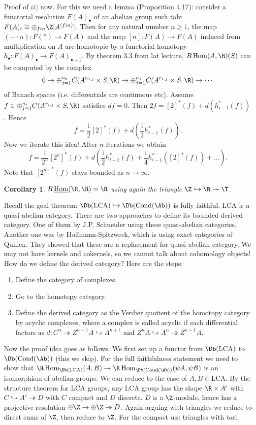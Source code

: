 \documentclass[A4paper, british]{amsart}
\theoremstyle{darkgreentheorem}
\newtheorem{cor}[thm]{Corollary}
\theoremstyle{darkbluedefinition}
\theoremstyle{darkredexample}
\theoremstyle{remark}
\DeclareMathOperator{\Hom}{Hom}
\DeclareMathOperator{\Cond}{Cond}
\DeclareMathOperator{\ihom}{\underline{Hom}}
\newcommand{\1}{\mathbbm{1}}
\newcommand{\op}{\oplus}
\newcommand{\tms}{\times}
\newcommand{\epi}{\twoheadrightarrow}
\newcommand{\mono}{\hookrightarrow}
\newcommand{\LCA}{\mathrm{LCA}}
\begin{document}
Proof of $ii)$ now.
For this we need a lemma (Proposition 4.17): consider a functorial resolution $F(A)_{\bullet}$ of an abelian group such taht $F(A)_{i}\cong \op_{fin}\Z[A^{(fin)}]$.
Then for any natural number $n\geqslant 1$, the map $(-\cdot n)\colon F(*)\to F(A)$ and the map $[n]\colon F(A)\to F(A)$ induced from multiplication on $A$ are homotopic by a functorial homotopy $h_{\bullet}\colon F(A)_{\bullet}\to F(A)_{\bullet +1}$.
By theorem 3.3 from lat lecture, $R\Hom(A,\R)(S)$ can be computed by the complex
\[ 0\to \op_{j=1}^{n_{0}}C(A^{r_{0,j}}\tms S,\R)\to \op_{j=1}^{n_{1}}C(A^{r_{1,j}}\tms S,\R)\to \cdots \]
of Banach spaces (i.e. differentials are continuous etc).
Assume $f\in \op_{j=1}^{n_{i}}C(A^{r_{i,j}}\tms S,\R)$ satisfies $df=0$.
Then $2f=[2]^{*}(f)+d(h_{i-1}^{*}(f))$.
Hence
\[ f=\frac{1}{2}[2]^{*}(f)+d(\frac{1}{2}h_{i-1}^{*}(f)).\]
Now we iterate this idea!
After $n$ iterations we obtain
\[ f=\frac{1}{2^{n}}[2^{n}]^{*}(f)+d(\frac{1}{2}h_{i-1}^{*}(f)+\frac{1}{4}h_{i-1}^{*}([2]^{*}(f))+\ldots ). \]
Note that $[2^{n}]^{*}(f)$ stays bounded as $n\to \infty$.

\begin{cor}
    $R\ihom(\R,\R)=\R$ using again the triangle $\Z\mono\R\epi\T$.
\end{cor}

Recall the goal theorem: $\Db(\LCA)\mono \Db(\Cond(\Ab))$ is fully faithful.
$\LCA$ is a quasi-abelian category.
There are two approaches to define its bounded derived category.
One of them by J.P. Schneider using these quasi-abelian categories.
Another one was by Hoffmann-Spitzweck, which is using exact categories of Quillen.
They showed that these are a replacement for quasi-abelian category.
We may not have kernels and cokernels, so we cannot talk about cohomology objects!
How do we define the derived category?
Here are the steps:

\begin{enumerate}
    \item Define the category of complexes.
    \item Go to the homotopy category.
    \item Define the derived category as the Verdier quotient of the homotopy category by acyclic complexes, where a complex is called acyclic if each differential factors as $d\colon C^{n}\epi Z^{n+1}A\mono A^{n+1}$ and $Z^{n}A\mono A^{n}\epi Z^{n+1}A$.
\end{enumerate}

Now the proof idea goes as follows.
We first set up a functor from $\Db(\LCA)$ to $\Db(\Cond(\Ab))$ (this we skip).
For the full faithfulness statement we need to show that $\R\Hom_{\Db(\LCA)}(A,B)\to \R\Hom_{\Db(\Cond(\Ab))}(\psi A,\psi B)$ is an isomorphism of abelian groups.
We can reduce to the case of $A,B\in \LCA$.
By the structure theorem for $\LCA$ groups, any $\LCA$ group has the shape $\R\tms A'$ with $C\mono A'\epi D$ with $C$ compact and $D$ discrete.
$D$ is a $\Z$-module, hence has a projective resolution $\op \Z\to \op \Z\epi D$.
Again arguing with triangles we reduce to direct sums of $\Z$, then reduce to $\Z$.
For the compact use triangles with tori.
\end{document}
